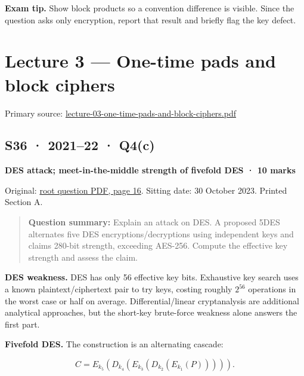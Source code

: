 \documentclass[11pt,a4paper]{article}
\begin{document}
{\color{ForestGreen}\textbf{Exam tip.} Show block products so a convention difference is visible. Since the question asks only encryption,\allowbreak{} report that result and briefly flag the key defect.}



\clearpage
\section{Lecture 3 — One-time pads and block ciphers}

Primary source: \href{../slides/lecture-03-one-time-pads-and-block-ciphers.pdf}{lecture-03-one-time-pads-and-block-ciphers.\allowbreak{}pdf}




\subsection{S36 · 2021–22 · Q4(c)}\label{s36}

\textbf{DES attack; meet-in-the-middle strength of fivefold DES · 10 marks}


Original: \href{../../CSE405-Security_Merged.pdf\#page=16}{root question PDF,\allowbreak{} page 16}. Sitting date: 30 October 2023. Printed Section A.



\begin{quote}\small

\textbf{Question summary:} Explain an attack on DES. A proposed 5DES alternates five DES encryptions/\allowbreak{}decryptions using independent keys and claims 280-bit strength,\allowbreak{} exceeding AES-256. Compute the effective key strength and assess the claim.



\end{quote}

\textbf{DES weakness.} DES has only 56 effective key bits. Exhaustive key search uses a known plaintext/\allowbreak{}ciphertext pair to try keys,\allowbreak{} costing roughly \(2^{56}\) operations in the worst case or half on average. Differential/\allowbreak{}linear cryptanalysis are additional analytical approaches,\allowbreak{} but the short-key brute-force weakness alone answers the first part.


\textbf{Fivefold DES.} The construction is an alternating cascade:



\[
C=E_{k_5}\!\left(D_{k_4}\!\left(E_{k_3}\!\left(D_{k_2}\!\left(E_{k_1}(P)\right)\right)\right)\right).
\]
\end{document}
